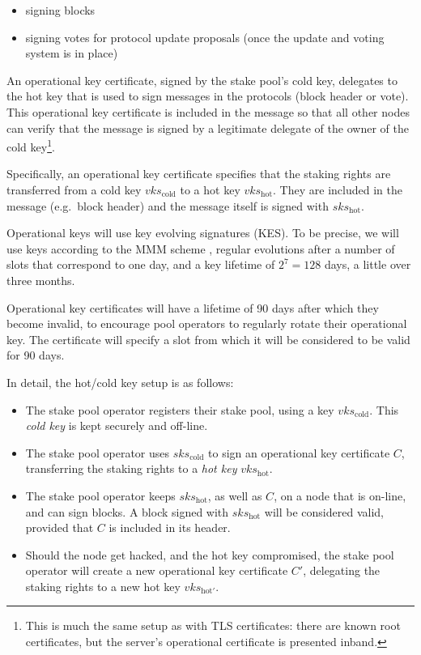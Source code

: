 \documentclass[11pt,a4paper]{article}
\begin{document}
\begin{itemize}
\item
  signing blocks
\item signing votes for protocol update proposals (once the update and
  voting system is in place)
\end{itemize}

An operational key certificate, signed by the stake pool's cold key,
delegates to the hot key that is used to sign messages in the
protocols (block header or vote). This operational key certificate is
included in the message so that all other nodes can verify that the
message is signed by a legitimate delegate of the owner of the cold
key\footnote{This is much the same setup as with TLS certificates:
  there are known root certificates, but the server's operational
  certificate is presented inband.}.

Specifically, an operational key certificate specifies that the
staking rights are transferred from a cold key \(vks_\text{cold}\)
to a hot key \(vks_\text{hot}\).
They are included in the message (e.g.~block header) and the message
itself is signed with \(sks_\text{hot}\).

Operational keys will use key evolving signatures (KES). To be precise, we will
use keys according to the MMM scheme \citep{cryptoeprint:2001:034}, regular
evolutions after a number of slots that correspond to one day, and a key
lifetime of \(2^7 = 128\) days, a little over three months.

Operational key certificates will have a lifetime of 90 days after which they
become invalid, to encourage pool operators to regularly rotate their
operational key. The certificate will specify a slot from which it will be
considered to be valid for 90 days.

In detail, the hot/cold key setup is as follows:

\begin{itemize}
\item
  The stake pool operator registers their stake pool, using a key
  \(vks_\text{cold}\). This \emph{cold key} is kept securely and
  off-line.
\item The stake pool operator uses \(sks_\text{cold}\)
  to sign an operational key certificate \(C\),
  transferring the staking rights to a \emph{hot key}
  \(vks_\text{hot}\).
\item
  The stake pool operator keeps \(sks_\text{hot}\), as well as \(C\), on
  a node that is on-line, and can sign blocks. A block signed with
  \(sks_\text{hot}\) will be considered valid, provided that \(C\) is
  included in its header.
\item
  Should the node get hacked, and the hot key compromised, the stake
  pool operator will create a new operational key certificate
  \(C'\), delegating the staking rights to a new hot key
  \(vks_{\text{hot}'}\).
\end{itemize}
\end{document}
